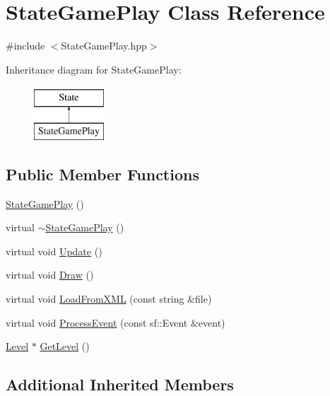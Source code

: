\hypertarget{class_state_game_play}{\section{State\-Game\-Play Class Reference}
\label{class_state_game_play}
}


{\ttfamily \#include $<$State\-Game\-Play.\-hpp$>$}

Inheritance diagram for State\-Game\-Play\-:\begin{figure}[H]
\begin{center}
\leavevmode
\includegraphics[height=2.000000cm]{class_state_game_play}
\end{center}
\end{figure}
\subsection*{Public Member Functions}
\begin{DoxyCompactItemize}
\item 
\hyperlink{class_state_game_play_ad7bfeabc7184e166b372e63c68c1ace9}{State\-Game\-Play} ()
\item 
virtual \hyperlink{class_state_game_play_aa4538a8a8ff81e66c0c826249d410c63}{$\sim$\-State\-Game\-Play} ()
\item 
virtual void \hyperlink{class_state_game_play_a56b45e9ee196d709557dac2a3a6f2b3d}{Update} ()
\item 
virtual void \hyperlink{class_state_game_play_a5a4710616480b177cc8164675d5295ae}{Draw} ()
\item 
virtual void \hyperlink{class_state_game_play_ab959c0ecf1e0db614a89a87bacd1ead1}{Load\-From\-X\-M\-L} (const string \&file)
\item 
virtual void \hyperlink{class_state_game_play_a9123dfdcf99f92706a00740245e98d23}{Process\-Event} (const sf\-::\-Event \&event)
\item 
\hyperlink{class_level}{Level} $\ast$ \hyperlink{class_state_game_play_a5bd072a6e7414b47fd9fcdfa34301aa6}{Get\-Level} ()
\end{DoxyCompactItemize}
\subsection*{Additional Inherited Members}


